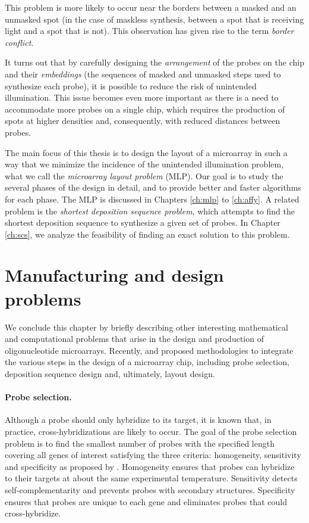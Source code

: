This problem is more likely to occur near the borders between a masked and an
unmasked spot (in the case of maskless synthesis, between a spot that is
receiving light and a spot that is not). This observation has given rise to the
term \emph{border conflict}.

It turns out that by carefully designing the \emph{arrangement} of the probes on
the chip and their \emph{embeddings} (the sequences of masked and unmasked steps
used to synthesize each probe), it is possible to reduce the risk of unintended
illumination. This issue becomes even more important as there is a need to
accommodate more probes on a single chip, which requires the production of spots
at higher densities and, consequently, with reduced distances between probes.

The main focus of this thesis is to design the layout of a microarray in such a
way that we minimize the incidence of the unintended illumination problem, what
we call the \emph{microarray layout problem} (MLP). Our goal is to study the
several phases of the design in detail, and to provide better and faster
algorithms for each phase. The MLP is discussed in Chapters \ref{ch:mlp} to
\ref{ch:affy}. A related problem is the \emph{shortest deposition sequence
problem}, which attempts to find the shortest deposition sequence to synthesize
a given set of probes. In Chapter \ref{ch:scs}, we analyze the feasibility of
finding an exact solution to this problem.

\section{Manufacturing and design problems}
\label{sec:intro_problems}

We conclude this chapter by briefly describing other interesting mathematical
and computational problems that arise in the design and production of
oligonucleotide microarrays. Recently, \citet{Kahng2003b,Kahng2006} and
\citet{Atlas2004} proposed methodologies to integrate the various steps in the
design of a microarray chip, including probe selection, deposition sequence
design and, ultimately, layout design.

\paragraph{Probe selection.} Although a probe should only hybridize to its
target, it is known that, in practice, cross-hybridizations are likely to occur.
The goal of the probe selection problem is to find the smallest number of probes
with the specified length covering all genes of interest satisfying the three
criteria: homogeneity, sensitivity and specificity as proposed by
\citet{Lockhart1996}. Homogeneity ensures that probes can hybridize to their
targets at about the same experimental temperature. Sensitivity detects
self-complementarity and prevents probes with secondary structures. Specificity
ensures that probes are unique to each gene and eliminates probes that could
cross-hybridize.

